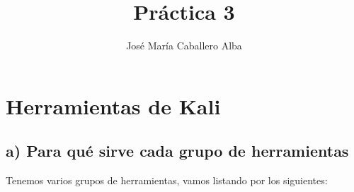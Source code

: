 \documentclass[a4paper]{article}
\title{Práctica 3 }
\author{José María Caballero Alba}
\begin{document}
\maketitle

\newpage

\tableofcontents



\section{Herramientas de Kali}
\subsection{a) Para qué sirve cada grupo de herramientas }

Tenemos varios grupos de herramientas, vamos listando por los siguientes:
\end{document}
